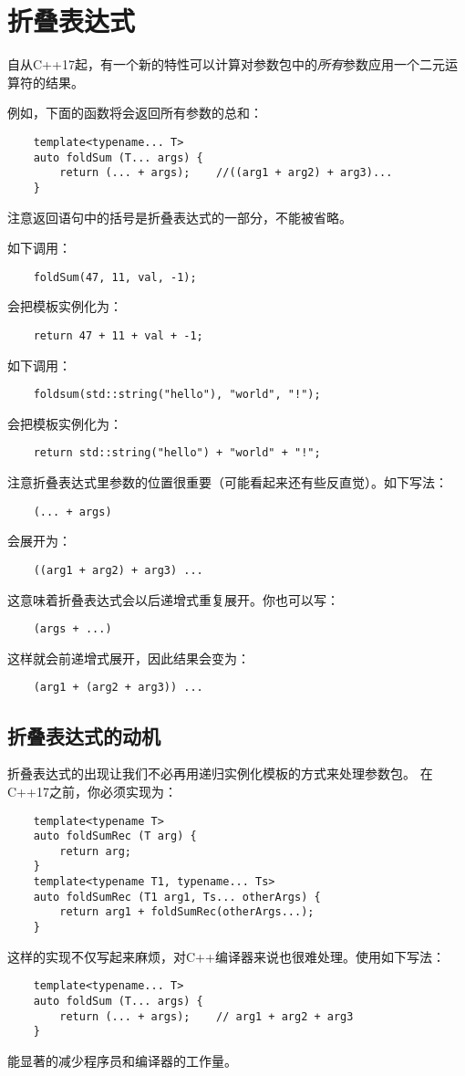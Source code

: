 \section{折叠表达式}\label{ch11}
自从C++17起，有一个新的特性可以计算对参数包中的\emph{所有}参数应用一个二元运算符的结果。

例如，下面的函数将会返回所有参数的总和：
\begin{lstlisting}
    template<typename... T>
    auto foldSum (T... args) {
        return (... + args);    //((arg1 + arg2) + arg3)...
    }
\end{lstlisting}
注意返回语句中的括号是折叠表达式的一部分，不能被省略。

如下调用：
\begin{lstlisting}
    foldSum(47, 11, val, -1);
\end{lstlisting}
会把模板实例化为：
\begin{lstlisting}
    return 47 + 11 + val + -1;
\end{lstlisting}
如下调用：
\begin{lstlisting}
    foldsum(std::string("hello"), "world", "!");
\end{lstlisting}
会把模板实例化为：
\begin{lstlisting}
    return std::string("hello") + "world" + "!";
\end{lstlisting}
注意折叠表达式里参数的位置很重要（可能看起来还有些反直觉）。如下写法：
\begin{lstlisting}
    (... + args)
\end{lstlisting}
会展开为：
\begin{lstlisting}
    ((arg1 + arg2) + arg3) ...
\end{lstlisting}
这意味着折叠表达式会以后递增式重复展开。你也可以写：
\begin{lstlisting}
    (args + ...)
\end{lstlisting}
这样就会前递增式展开，因此结果会变为：
\begin{lstlisting}
    (arg1 + (arg2 + arg3)) ...
\end{lstlisting}

\subsection{折叠表达式的动机}
折叠表达式的出现让我们不必再用递归实例化模板的方式来处理参数包。
在C++17之前，你必须实现为：
\begin{lstlisting}
    template<typename T>
    auto foldSumRec (T arg) {
        return arg;
    }
    template<typename T1, typename... Ts>
    auto foldSumRec (T1 arg1, Ts... otherArgs) {
        return arg1 + foldSumRec(otherArgs...);
    }
\end{lstlisting}
这样的实现不仅写起来麻烦，对C++编译器来说也很难处理。使用如下写法：
\begin{lstlisting}
    template<typename... T>
    auto foldSum (T... args) {
        return (... + args);    // arg1 + arg2 + arg3
    }
\end{lstlisting}
能显著的减少程序员和编译器的工作量。

